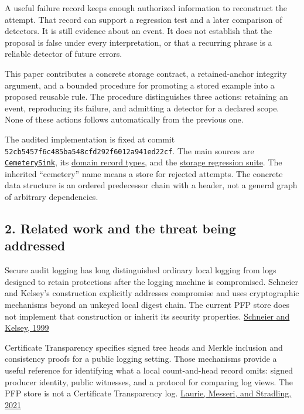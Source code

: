 \documentclass[
  11pt,
]{article}
\newcommand{\passthrough}[1]{#1}
\begin{document}
A useful failure record keeps enough authorized information to
reconstruct the attempt. That record can support a regression test and a
later comparison of detectors. It is still evidence about an event. It
does not establish that the proposal is false under every
interpretation, or that a recurring phrase is a reliable detector of
future errors.

This paper contributes a concrete storage contract, a retained-anchor
integrity argument, and a bounded procedure for promoting a stored
example into a proposed reusable rule. The procedure distinguishes three
actions: retaining an event, reproducing its failure, and admitting a
detector for a declared scope. None of these actions follows
automatically from the previous one.

The audited implementation is fixed at commit
\nolinkurl{52cb5457f6c485ba548cfd292f6012a941ed22cf}. The main sources
are
\href{https://github.com/dbccpage/the_symbol_game/blob/52cb5457f6c485ba548cfd292f6012a941ed22cf/omega_engine_symbol_game/infrastructure/persistence/cemetery_sink.py}{\passthrough{\lstinline!CemeterySink!}},
its
\href{https://github.com/dbccpage/the_symbol_game/blob/52cb5457f6c485ba548cfd292f6012a941ed22cf/omega_engine_symbol_game/domain/entities/cemetery_entry.py}{domain
record types}, and the
\href{https://github.com/dbccpage/the_symbol_game/blob/52cb5457f6c485ba548cfd292f6012a941ed22cf/omega_engine_symbol_game/tests/test_cemetery_sink.py}{storage
regression suite}. The inherited ``cemetery'' name means a store for
rejected attempts. The concrete data structure is an ordered predecessor
chain with a header, not a general graph of arbitrary dependencies.

\subsection{2. Related work and the threat being
addressed}\label{related-work-and-the-threat-being-addressed}

Secure audit logging has long distinguished ordinary local logging from
logs designed to retain protections after the logging machine is
compromised. Schneier and Kelsey's construction explicitly addresses
compromise and uses cryptographic mechanisms beyond an unkeyed local
digest chain. The current PFP store does not implement that construction
or inherit its security properties.
\href{https://www.schneier.com/academic/archives/1999/05/secure_audit_logs_to.html}{Schneier
and Kelsey, 1999}

Certificate Transparency specifies signed tree heads and Merkle
inclusion and consistency proofs for a public logging setting. Those
mechanisms provide a useful reference for identifying what a local
count-and-head record omits: signed producer identity, public witnesses,
and a protocol for comparing log views. The PFP store is not a
Certificate Transparency log.
\href{https://www.rfc-editor.org/rfc/rfc9162.html}{Laurie, Messeri, and
Stradling, 2021}
\end{document}
